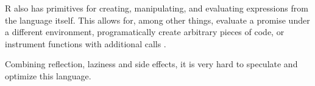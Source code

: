 R also has primitives for creating, manipulating, and evaluating expressions from the language itself. This allows for, among other things, evaluate a promise under a different environment, programatically create arbitrary pieces of code, or instrument functions with additional calls .

Combining reflection, laziness and side effects, it is very hard to speculate and optimize this language.

%
%
%
